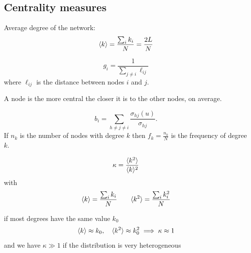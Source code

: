 \documentclass[a4paper,9pt]{extarticle}
\begin{document}
\begin{multicols*}{2}
	\section{Centrality measures}
	Average degree of the network:
	\begin{equation*}
		\langle k \rangle=\frac{\sum_{i}k_{i}}{N}=\frac{2L}{N}
	\end{equation*}
	\begin{riquadro}[Closeness]
		\begin{equation*}
			g_{i}=\frac{1}{\sum_{j\neq i}\ell_{ij}}
		\end{equation*}
		where $\ell_{ij}$ is the distance between nodes $i$ and $j$.
	\end{riquadro}
	A node is the more central the closer it is to the other nodes, on average.
		\begin{riquadro}[Betweenness]
		\begin{equation*}
			b_{i}=\sum_{h\neq j\neq i}\frac{\sigma_{hj}(u)}{\sigma_{hj}}.
		\end{equation*}
		If $n_{k}$ is the number of nodes with degree $k$ then $f_{k}=\frac{n_{k}}{N}$ is the frequency of degree $k$.
	\end{riquadro}
	\begin{riquadro}
		\begin{equation*}
			\kappa=\frac{\langle k^{2} \rangle}{\langle k \rangle^{2}}
		\end{equation*}
		with
		\begin{equation*}
			\langle k \rangle=\frac{\sum_{i}k_{i}}{N}\qquad\langle k^{2} \rangle=\frac{\sum_{i}k^{2}_{i}}{N}
		\end{equation*}
		\end{riquadro}
		if most degrees have the same value $k_{0}$
		\begin{equation*}
			\langle k \rangle\approx k_{0},\quad\langle k^{2} \rangle\approx k_{0}^{2}\implies \kappa\approx1
		\end{equation*}
		and we have $\kappa\gg1$ if the distribution is very heterogeneous 

\end{multicols*}
\end{document}

